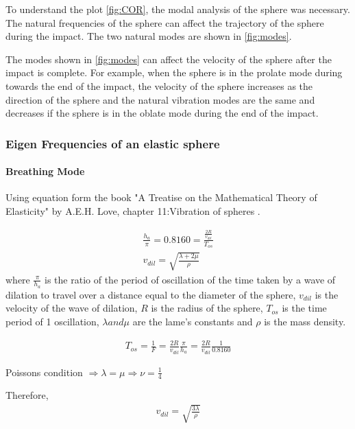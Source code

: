 To understand the plot \ref{fig:COR}, the modal analysis of the sphere was necessary. The natural frequencies of the sphere can affect the trajectory of the sphere during the impact. The two natural modes are shown in \ref{fig:modes}.

The modes shown in \ref{fig:modes} can affect the velocity of the sphere after the impact is complete. For example, when the sphere is in the prolate mode during towards the end of the impact, the velocity of the sphere increases as the direction of the sphere and the natural vibration modes are the same and decreases if the sphere is in the oblate mode during the end of the impact. 

\subsubsection{Eigen Frequencies of an elastic sphere}

\paragraph{Breathing Mode}

Using equation form the book "A Treatise on the Mathematical Theory of Elasticity" by A.E.H. Love, chapter 11:Vibration of spheres \citep{aelove}.

\begin{equation}
\begin{split}
\frac{h_{a}}{\pi} = 0.8160 = \frac{\frac{2R}{v_{dil}}}{T_{os}}\\
v_{dil} = \sqrt{\frac{\lambda + 2\mu}{\rho}}
\end{split}
\label{eq:eigen}
\end{equation} 
where $\frac{\pi}{h_{a}}$ is the ratio of the period of oscillation of the time taken by a wave of dilation to travel over a  distance equal to the diameter of the sphere, $v_{dil}$ is the velocity of the wave of dilation, $R$ is the radius of the sphere, $T_{os}$ is the time period of 1 oscillation, $\lambda and \mu$ are the lame's constants and $\rho$ is the mass density.

\begin{align}
T_{os} = \frac{1}{F} = \frac{2R}{v_{dil}} \frac{\pi}{h_{a}} = \frac{2R}{v_{dil}} \frac{1}{0.8160}
\end{align}

Poissons condition $\Rightarrow \lambda = \mu \Rightarrow \nu=\frac{1}{4}$

Therefore,
\begin{align}
 v_{dil} = \sqrt{\frac{3\lambda}{\rho}}
\end{align}

